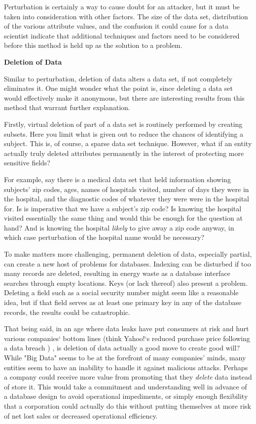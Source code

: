 \documentclass[10pt,journal,compsoc]{IEEEtran}
\begin{document}
	Perturbation is certainly a way to cause doubt for an attacker, but it must be taken into consideration with other factors.  The size of the data set, distribution of the various attribute values, and the confusion it could cause for a data scientist indicate that additional techniques and factors need to be considered before this method is held up as the solution to a problem.\linebreak

\noindent \textbf{Deletion of Data}

	Similar to perturbation, deletion of data alters a data set, if not completely eliminates it.  One might wonder what the point is, since deleting a data set would effectively make it anonymous, but there are interesting results from this method that warrant further explanation.
	
	Firstly, virtual deletion of part of a data set is routinely performed by creating subsets. Here you limit what is given out to reduce the chances of identifying a subject.  This is, of course, a sparse data set technique.  However, what if an entity actually truly deleted attributes permanently in the interest of protecting more sensitive fields?  
	
	For example, say there is a medical data set that held information showing subjects' zip codes, ages, names of hospitals visited,  number of days they were in the hospital, and the diagnostic codes of whatever they were were in the hospital for.  Is is imperative that we have a subject's zip code?  Is knowing the hospital visited essentially the same thing and would this be enough for the question at hand?  And is knowing the hospital \textit{likely} to give away a zip code anyway, in which case perturbation of the hospital name would be necessary?
	
	To make matters more challenging, permanent deletion of data, especially partial, can create a new host of problems for databases.  Indexing can be disturbed if too many records are deleted, resulting in energy waste as a database interface searches through empty locations.  Keys (or lack thereof) also present a problem.  Deleting a field such as a social security number might seem like a reasonable idea, but if that field serves as at least one primary key in any of the database records, the results could be catastrophic.\linebreak

	That being said, in an age where data leaks have put consumers at risk and hurt various companies` bottom lines (think Yahoo!`s reduced purchase price following a data breach \cite{albanesius}) , is deletion of data actually a good move to create good will? While "Big Data" seems to be at the forefront of many companies' minds, many entities seem to have an inability to handle it against malicious attacks.  Perhaps a company could receive more value from promoting that they \textit{delete} data instead of store it.  This would take a commitment and understanding well in advance of a database design to avoid operational impediments, or simply enough flexibility that a corporation could actually do this without putting themselves at more risk of net lost sales or decreased operational efficiency.
\end{document}
